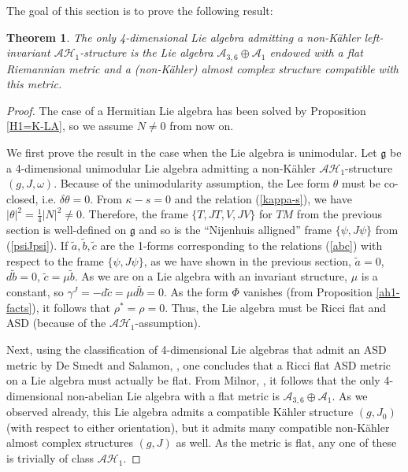\documentclass{amsart}
\newtheorem{theorem}{Theorem}[section]
\begin{document}
\vspace{0.2cm}

\noindent
The goal of this section is to prove the following result:
\begin{theorem} \label{uniqueLA}
The only 4-dimensional Lie algebra admitting a non-K\"ahler left-invariant $\mathcal{AH}_1$-structure is the Lie algebra $\mathcal{A}_{3,6}\oplus \mathcal{A}_1$ endowed with a flat Riemannian metric and a (non-K\"ahler) almost complex structure compatible with this metric.
\end{theorem}



\begin{proof} The case of a Hermitian Lie algebra has been solved by Proposition \ref{H1=K-LA}, so we assume $N\neq 0$ from now on.

We first prove the result in the case when the Lie algebra is unimodular. Let $\mathfrak{g}$ be a 4-dimensional unimodular Lie algebra admitting a non-K\"ahler $\mathcal{AH}_1$-structure $(g, J, \omega)$. Because of the unimodularity assumption, the Lee form $\theta$ must be co-closed, i.e. $\delta \theta = 0$. From $\kappa -s = 0$ and the relation (\ref{kappa-s}), we have 
 $|\theta|^2 = \frac{1}{4} |N|^2 \neq 0$. Therefore, the frame $\{T, JT, V, JV\}$ for $TM$ from the previous section is well-defined on $\mathfrak{g}$ and so is the ``Nijenhuis alligned'' frame $\{ \psi, J\psi \}$ from  (\ref{psiJpsi}). If $\tilde{a}, \tilde{b}, \tilde{c} $ are the 1-forms corresponding to the relations (\ref{abc}) with respect to the frame $\{ \psi, J\psi \}$, as we have shown in the previous section, $\tilde{a}=0$, $d\tilde{b} = 0$, $\tilde{c} = \mu \tilde{b}$. As we are on a Lie algebra with an invariant structure, $\mu$ is a constant, so $\gamma^J = - d\tilde{c} = \mu d\tilde{b} = 0$. As the form $\Phi$ vanishes (from Proposition \ref{ah1-facts}), it follows that $\rho^* = \rho = 0$. Thus, the Lie algebra must be Ricci flat and ASD (because of the $\mathcal{AH}_1$-assumption).
 
 Next, using the classification of 4-dimensional Lie algebras that admit an ASD metric by De Smedt and Salamon, \cite{DeSmSa}, one concludes that a Ricci flat ASD metric on a Lie algebra must actually be flat. From Milnor, \cite{Mil}, it follows that the only 4-dimensional non-abelian Lie algebra with a flat metric is $\mathcal{A}_{3,6}\oplus \mathcal{A}_1$. As we observed already, this Lie algebra admits a compatible K\"ahler structure $(g, J_0)$ (with respect to either orientation), but it admits many compatible non-K\"ahler almost complex structures $(g,J)$ as well. As the metric is flat, any one of these is trivially of class $\mathcal{AH}_1$.  


\end{proof}
\end{document}
